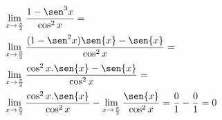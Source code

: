 \begin{ex}
\begin{align}
&\lim_{x\rightarrow \frac{\pi}{2}} \frac{1-\sen^3{x}}{\cos^2{x}}=\nonumber\\
&\lim_{x\rightarrow \frac{\pi}{2}} \frac{(1-\sen^2{x})\sen{x}-\sen{x}}{\cos^2{x}}=\nonumber\\
&\lim_{x\rightarrow \frac{\pi}{2}} \frac{\cos^2{x}.\sen{x}-\sen{x}}{\cos^2{x}}=\nonumber\\
&\lim_{x\rightarrow \frac{\pi}{2}} \frac{\cos^2{x}.\sen{x}}{\cos^2{x}}-\lim_{x\rightarrow \frac{\pi}{2}} \frac{\sen{x}}{\cos^2{x}}=\frac{0}{1}-\frac{0}{1}=0\nonumber
\end{align}
\end{ex}